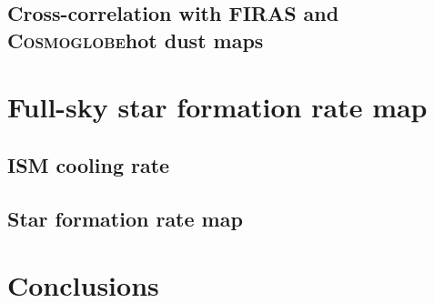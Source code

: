 \documentclass{aa}
\newcommand{\cosmoglobe}{\textsc{Cosmoglobe}}
\begin{document}
\subsection{Cross-correlation with FIRAS and \cosmoglobe hot dust maps}

\section{Full-sky star formation rate map}
\subsection{ISM cooling rate}
\subsection{Star formation rate map}


\section{Conclusions}
\label{sec:conclusions}




\end{document}
